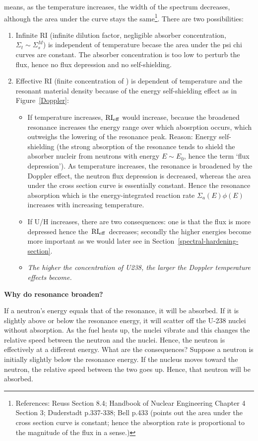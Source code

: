 \documentclass{school-22.211-notes}
\begin{document}
 means, as the temperature increases, the width of the spectrum decreases, although the area under the curve stays the same\footnote{References: Reuss Section 8.4; Handbook of Nuclear Engineering Chapter 4 Section 3; Duderstadt p.337-338; Bell p.433 (points out the area under the cross section curve is constant; hence the absorption rate is proportional to the magnitude of the flux in a sense.)}. 
There are two possibilities: 
\begin{enumerate}
\item Infinite RI (infinite dilution factor, negligible absorber concentration, $\Sigma_t \sim \Sigma_s^M$) is independent of temperature becase the area under the psi chi curves are constant. The absorber concentration is too low to perturb the flux, hence no flux depression and no self-shielding.  
\item Effective RI (finite concentration of ) is dependent of temperature and the resonant material density because of the energy self-shielding effect as in Figure~\ref{Doppler}: 
  \begin{itemize}
  \item If temperature increases, $\mathrm{RI}_{\mathrm{eff}}$ would increase, because the broadened resonance increases the energy range over which abosrption occurs, which outweighs the lowering of the resonance peak. Reason: Energy self-shielding (the strong absorption of the resonance tends to shield the absorber nucleir from neutrons with energy $E\sim E_0$, hence the term `flux depression').  As temperature increases, the resonance is broadened by the Doppler effect, the neutron flux depression is decreased, whereas the area under the cross section curve is essentially constant. Hence the resonance absorption which is the energy-integrated reaction rate $\Sigma_a(E) \phi(E)$ increases with increasing temperature. 
  \item If U/H increases, there are two consequences: one is that the flux is more depressed hence the $\left. \mathrm{RI}_{\mathrm{eff}} \right.$ decreases; secondly the higher energies become more important as we would later see in Section~\ref{spectral-hardening-section}. 
  \item \textit{The higher the concentration of U238, the larger the Doppler temperature effects become.}
  \end{itemize}
\end{enumerate}


\textbf{Why do resonance broaden?} 

If a neutron's energy equals that of the resonance, it will be absorbed. If it is
slightly above or below the resonance energy, it will scatter off the U-238 nuclei
without absorption. As the fuel heats up, the nuclei vibrate and this changes the
relative speed between the neutron and the nuclei. Hence, the neutron is
effectively at a different energy. What are the consequences? Suppose a neutron
is initially slightly below the resonance energy. If the nucleus moves toward the
neutron, the relative speed between the two goes up. Hence, that neutron will be
absorbed.
\end{document}
